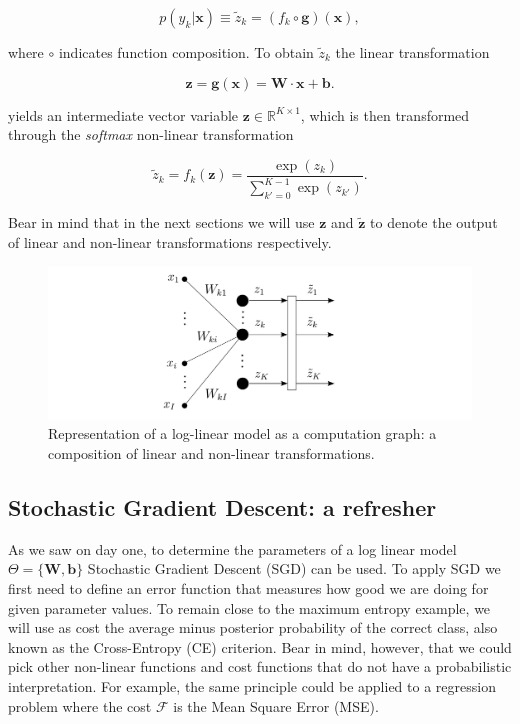\begin{equation}
p(y_k|\mathbf{x}) \equiv \tilde{z}_k = (f_k \circ \mathbf{g})(\mathbf{x}),
\end{equation}

\noindent where $\circ$ indicates function composition. To obtain $\tilde{z}_k$ the
linear transformation 

\begin{equation}
\mathbf{z} = \mathbf{g}(\mathbf{x}) = \mathbf{W} \cdot \mathbf{x} + \mathbf{b}.
\label{eq:linear}
\end{equation}

\noindent yields an intermediate vector variable $\mathbf{z} \in \mathbb{R}^{K \times
1}$, which is then transformed through the \textit{softmax} non-linear
transformation 

\begin{equation}
\tilde{z}_k = f_k(\mathbf{z}) = \frac{\exp(z_k)}{\sum_{k'=0}^{K-1} \exp(z_{k'})}.
\label{eq:softmax}
\end{equation}

Bear in mind that in the next sections we will use $\mathbf{z}$ and
$\tilde{\mathbf{z}}$ to denote the output of linear and non-linear
transformations respectively.

\begin{figure}
\centering
\includegraphics[scale=0.4]{figs/deep_learning/LayerP.pdf}
\caption{Representation of a log-linear model as a computation graph: a
composition of linear and non-linear transformations.}
\label{fig:LayerP}
\end{figure}

\subsection{Stochastic Gradient Descent: a refresher}

As we saw on day one, to determine the parameters of a log linear model
$\Theta=\{\mathbf{W}, \mathbf{b}\}$ Stochastic Gradient Descent (SGD) can be
used. To apply SGD we first need to define an error function that measures how
good we are doing for given parameter values. To remain close to the maximum
entropy example, we will use as cost the average minus posterior probability of
the correct class, also known as the Cross-Entropy (CE) criterion. Bear in
mind, however, that we could pick other non-linear functions and cost functions
that do not have
a probabilistic interpretation. For example, the same principle could be applied to
a regression problem where the cost $\mathcal{F}$ is the Mean Square Error (MSE).

